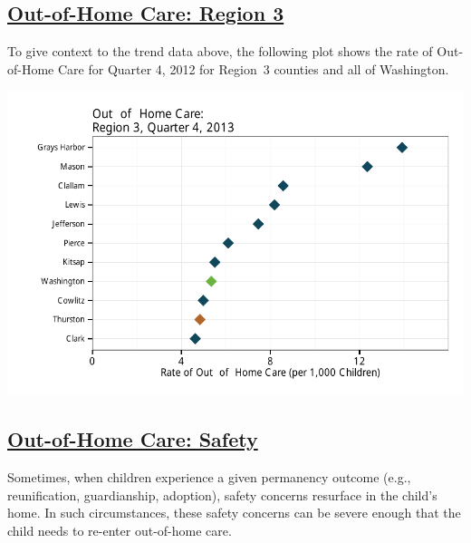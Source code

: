 \documentclass{article}\usepackage{graphicx, color}
\makeatletter
\def\maxwidth{ %
  \ifdim\Gin@nat@width>\linewidth
    \linewidth
  \else
    \Gin@nat@width
  \fi
}
\newenvironment{knitrout}{}{} %
\makeatother
\begin{document}
\subsection{\href{http://www.partnersforourchildren.org/child-well-being/visualizations/out-home-care/trends}
    {Out-of-Home Care: Region 3}
}
To give context to the trend data above, the following plot shows the rate of Out-of-Home Care for Quarter 4, 2012 for Region~3 counties and all of Washington.
\nopagebreak[3]
\begin{knitrout}
\color{fgcolor}

{\centering \includegraphics[width=\maxwidth]{figure/ooh_context} 

}



\end{knitrout}


\subsection{\href{http://www.partnersforourchildren.org/child-well-being/visualizations/out-home-care/safety}
    {Out-of-Home Care: Safety}
}

Sometimes, when children experience a given permanency outcome (e.g., reunification, guardianship, adoption), safety concerns resurface in the child's home. In such circumstances, these safety concerns can be severe enough that the child needs to re-enter out-of-home care.
\end{document}
